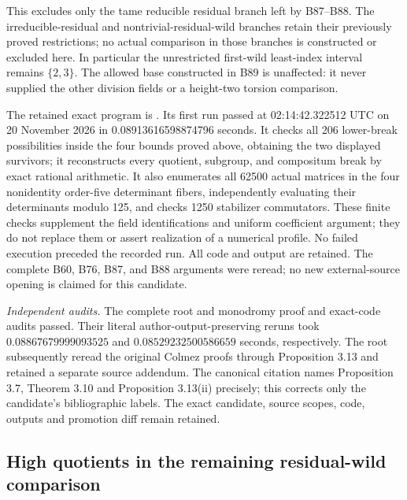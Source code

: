 \begin{remark}
\label{rem:B-RD90-scope}
This excludes only the tame reducible residual branch left
by B87--B88. The irreducible-residual and nontrivial-residual-wild
branches retain their previously proved restrictions; no
actual comparison in those branches is constructed or excluded
here. In particular the unrestricted first-wild least-index
interval remains \(\{2,3\}\). The allowed base constructed
in B89 is unaffected: it never supplied the other division
fields or a height-two torsion comparison.

The retained exact program is
.
Its first run passed at 02:14:42.322512 UTC on 20 November 2026
in 0.08913616598874796 seconds. It checks all 206 lower-break
possibilities inside the four bounds proved above, obtaining
the two displayed survivors; it reconstructs every quotient,
subgroup, and compositum break by exact rational arithmetic.
It also enumerates all 62500 actual matrices in the four
nonidentity order-five determinant fibers, independently
evaluating their determinants modulo 125, and checks 1250
stabilizer commutators. These finite checks supplement the
field identifications and uniform coefficient argument;
they do not replace them or assert realization of a numerical
profile. No failed execution preceded the recorded run.
All code and output are retained. The complete B60, B76,
B87, and B88 arguments were reread; no new external-source
opening is claimed for this candidate.

\smallskip
\noindent\emph{Independent audits.}
The complete root and monodromy proof and exact-code audits passed.
Their literal author-output-preserving reruns took
\(0.08867679999093525\) and
\(0.08529232500586659\) seconds, respectively.
The root subsequently reread the original Colmez proofs through
Proposition 3.13 and retained a separate source addendum. The canonical
citation names Proposition 3.7, Theorem 3.10 and Proposition 3.13(ii)
precisely; this corrects only the candidate's bibliographic labels.
The exact candidate, source scopes, code, outputs and promotion diff
remain retained.
\end{remark}


\subsection{High quotients in the remaining residual-wild comparison}

